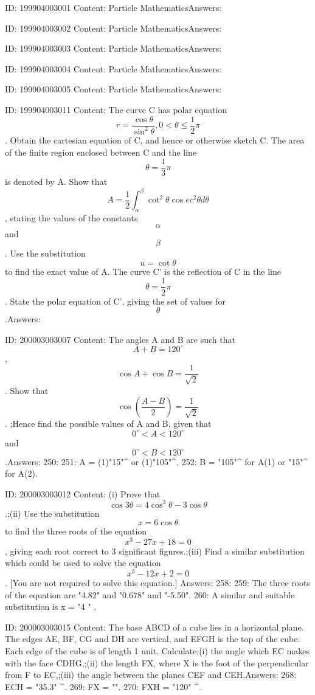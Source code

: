 \documentclass{article}
\begin{document}
ID: 199904003001
Content:
Particle MathematicsAnswers:

ID: 199904003002
Content:
Particle MathematicsAnswers:

ID: 199904003003
Content:
Particle MathematicsAnswers:

ID: 199904003004
Content:
Particle MathematicsAnswers:

ID: 199904003005
Content:
Particle MathematicsAnswers:

ID: 199904003011
Content:
The curve C has polar equation \[r = \frac {\cos \theta}{\sin^2 \theta}, 0 < \theta \leq \frac {1}{2}\pi\]. Obtain the cartesian equation of C, and hence or otherwise sketch C. The area of the finite region enclosed between C and the line \[\theta = \frac {1}{3}\pi\] is denoted by A. Show that \[A = \frac{1}{2}\int_{\alpha}^{\beta} \cot^2 \theta \cos ec^2 \theta d \theta\], stating the values of the constants \[\alpha\] and \[\beta\]. Use the substitution \[u = \cot \theta\] to find the exact value of A. The curve C' is the reflection of C in the line \[\theta = \frac {1}{2} \pi\]. State the polar equation of C', giving the set of values for \[\theta\].Answers:

ID: 200003003007
Content:
The angles A and B are such that \[A + B = 120^{\circ}\], \[\cos A + \cos B = \frac{1}{\sqrt{2}}\]. Show that \[\cos (\frac{A - B}{2}) = \frac{1}{\sqrt{2}}\]. ;Hence find the possible values of A and B, given that \[0^{\circ} < A < 120^{\circ}\] and \[0^{\circ} < B < 120^{\circ}\].Answers:
250: 
251: A = (1)"15"^{\circ} or (1)"105"^{\circ}.
252: B = "105"^{\circ} for A(1) or "15"^{\circ} for A(2).

ID: 200003003012
Content:
(i) Prove that \[\cos 3\theta = 4\cos^3 \theta - 3\cos \theta\].;(ii) Use the substitution \[x = 6\cos \theta\] to find the three roots of the equation \[x^3 - 27x + 18 = 0\], giving each root correct to 3 significant figures.;(iii) Find a similar substitution which could be used to solve the equation \[x^3 - 12x + 2 = 0\]. [You are not required to solve this equation.] Answers:
258: 
259: The three roots of the equation are "4.82" and "0.678" and "-5.50".
260: A similar and suitable substitution is x = "4 \cos{\theta}" .

ID: 200003003015
Content:
The base ABCD of a cube lies in a horizontal plane. The edges AE, BF, CG and DH are vertical, and EFGH is the top of the cube. Each edge of the cube is of length 1 unit. Calculate;(i) the angle which EC makes with the face CDHG,;(ii) the length FX, where X is the foot of the perpendicular from F to EC,;(iii) the angle between the planes CEF and CEH.Answers:
268: \angle ECH = "35.3" ^{\circ}.
269: FX = "".
270: \angle FXH = "120" ^{\circ}.
\end{document}
